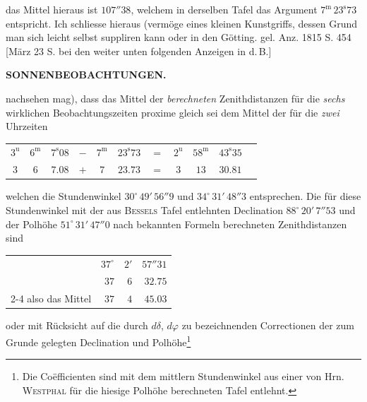 \noindent das Mittel hieraus ist $107''38$, welchem in derselben Tafel das Argument $7^{\mathrm m}\,23^{\mathrm s}73$ entspricht. Ich schliesse hieraus (vermöge eines kleinen Kunstgriffs, dessen Grund man sich leicht selbst suppliren kann oder in den Götting. gel. Anz. 1815 S. 454 [März 23 S. bei den weiter unten folgenden Anzeigen in d.\,B.]\par
{}
\clearpage
\thispagestyle{empty}
\noindent{}%
%
\parbox[t]{\dimexpr\linewidth-24mm\relax}{\centering\footnotesize\bfseries SONNENBEOBACHTUNGEN.\par}%
\makebox[12mm][r]{}\par\nobreak\medskip
\noindent nachsehen mag), dass das Mittel der \emph{berechneten} Zenithdistanzen für die \emph{sechs} wirklichen Beobachtungszeiten proxime gleich sei dem Mittel der für die \emph{zwei} Uhrzeiten

\begin{center}\fontsize{9}{11}\selectfont\setlength{\tabcolsep}{3pt}\begin{tabular}{ccccccccccc}
$3^{\mathrm u}$ & $6^{\mathrm m}$ & $7^{\mathrm s}08$ & $-$ & $7^{\mathrm m}$ & $23^{\mathrm s}73$ & $=$ & $2^{\mathrm u}$ & $58^{\mathrm m}$ & $43^{\mathrm s}35$\\
$3$ & $6$ & $7.08$ & $+$ & $7$ & $23.73$ & $=$ & $3$ & $13$ & $30.81$\\
\end{tabular}\end{center}

\noindent welchen die Stundenwinkel $30^\circ\,49'\,56''9$ und $34^\circ\,31'\,48''3$ entsprechen. Die für diese Stundenwinkel mit der aus \textsc{Bessels} Tafel entlehnten Declination $88^\circ\,20'\,7''53$ und der Polhöhe $51^\circ\,31'\,47''0$ nach bekannten Formeln berechneten Zenithdistanzen sind

\begin{center}\fontsize{10}{12}\selectfont\begin{tabular}{lrrr}
& $37^\circ$ & $2'$ & $57''31$\\
& $37$ & $6$ & $32.75$\\\cline{2-4}
also das Mittel & $37$ & $4$ & $45.03$\\
\end{tabular}\end{center}
\noindent oder mit Rücksicht auf die durch $d\delta$, $d\varphi$ zu bezeichnenden Correctionen der zum Grunde gelegten Declination und Polhöhe\footnote{Die Coëfficienten sind mit dem mittlern Stundenwinkel aus einer von Hrn. \textsc{Westphal} für die hiesige Polhöhe berechneten Tafel entlehnt.}

